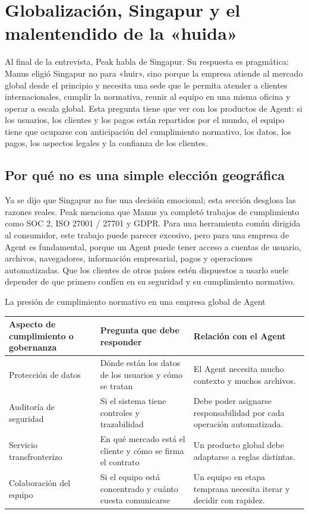 \section{Globalización, Singapur y el malentendido de la «huida»}

Al final de la entrevista, Peak habla de Singapur. Su respuesta es pragmática: Manus eligió Singapur no para «huir», sino porque la empresa atiende al mercado global desde el principio y necesita una sede que le permita atender a clientes internacionales, cumplir la normativa, reunir al equipo en una misma oficina y operar a escala global. Esta pregunta tiene que ver con los productos de Agent: si los usuarios, los clientes y los pagos están repartidos por el mundo, el equipo tiene que ocuparse con anticipación del cumplimiento normativo, los datos, los pagos, los aspectos legales y la confianza de los clientes.

\subsection{Por qué no es una simple elección geográfica}

Ya se dijo que Singapur no fue una decisión emocional; esta sección desglosa las razones reales. Peak menciona que Manus ya completó trabajos de cumplimiento como SOC 2, ISO 27001 / 27701 y GDPR. Para una herramienta común dirigida al consumidor, este trabajo puede parecer excesivo, pero para una empresa de Agent es fundamental, porque un Agent puede tener acceso a cuentas de usuario, archivos, navegadores, información empresarial, pagos y operaciones automatizadas. Que los clientes de otros países estén dispuestos a usarlo suele depender de que primero confíen en su seguridad y su cumplimiento normativo.

\begin{knowledgebox}{La presión de cumplimiento normativo en una empresa global de Agent}
\begin{tabularx}{\textwidth}{p{}p{}X}
\toprule
Aspecto de cumplimiento o gobernanza & Pregunta que debe responder & Relación con el Agent \\
\midrule
Protección de datos & Dónde están los datos de los usuarios y cómo se tratan & El Agent necesita mucho contexto y muchos archivos. \\
Auditoría de seguridad & Si el sistema tiene controles y trazabilidad & Debe poder asignarse responsabilidad por cada operación automatizada. \\
Servicio transfronterizo & En qué mercado está el cliente y cómo se firma el contrato & Un producto global debe adaptarse a reglas distintas. \\
Colaboración del equipo & Si el equipo está concentrado y cuánto cuesta comunicarse & Un equipo en etapa temprana necesita iterar y decidir con rapidez. \\
\bottomrule
\end{tabularx}
\end{knowledgebox}

